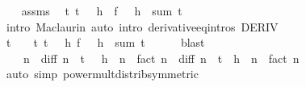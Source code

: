 \begin{isabellebody}
\ \ \isamarkupfalse%
\ assms\ \isamarkupfalse%
\ {\isachardoublequoteopen}{\isasymexists}t{\isachargreater}{\kern0pt}{}{\isachardot}{\kern0pt}\ t\ {\isacharless}{\kern0pt}\ {\isacharminus}{\kern0pt}\ h\ {\isasymand}\ f\ {\isacharparenleft}{\kern0pt}{\isacharminus}{\kern0pt}\ {\isacharparenleft}{\kern0pt}{\isacharminus}{\kern0pt}\ h{\isacharparenright}{\kern0pt}{\isacharparenright}{\kern0pt}\ {\isacharequal}{\kern0pt}\ {\isacharquery}{\kern0pt}sum\ t{\isachardoublequoteclose}\isanewline
\ \ \ \ \isamarkupfalse%
\ {\isacharparenleft}{\kern0pt}intro\ Maclaurin{\isacharparenright}{\kern0pt}\ {\isacharparenleft}{\kern0pt}auto\ intro{\isacharbang}{\kern0pt}{\isacharcolon}{\kern0pt}\ derivative{\isacharunderscore}{\kern0pt}eq{\isacharunderscore}{\kern0pt}intros\ DERIV{\isacharprime}{\kern0pt}{\isacharparenright}{\kern0pt}\isanewline
\ \ \isamarkupfalse%
\ \isamarkupfalse%
\ t\ \ {\isachardoublequoteopen}{}\ {\isacharless}{\kern0pt}\ t{\isachardoublequoteclose}\ {\isachardoublequoteopen}t\ {\isacharless}{\kern0pt}\ {\isacharminus}{\kern0pt}\ h{\isachardoublequoteclose}\ {\isachardoublequoteopen}f\ {\isacharparenleft}{\kern0pt}{\isacharminus}{\kern0pt}\ {\isacharparenleft}{\kern0pt}{\isacharminus}{\kern0pt}\ h{\isacharparenright}{\kern0pt}{\isacharparenright}{\kern0pt}\ {\isacharequal}{\kern0pt}\ {\isacharquery}{\kern0pt}sum\ t{\isachardoublequoteclose}\isanewline
\ \ \ \ \isamarkupfalse%
\ blast\isanewline
\ \ \isamarkupfalse%
\ \isamarkupfalse%
\ {\isachardoublequoteopen}{\isacharparenleft}{\kern0pt}{\isacharminus}{\kern0pt}\ {}{\isacharparenright}{\kern0pt}\ {\isacharcircum}{\kern0pt}\ n\ {\isacharasterisk}{\kern0pt}\ diff\ n\ {\isacharparenleft}{\kern0pt}{\isacharminus}{\kern0pt}\ t{\isacharparenright}{\kern0pt}\ {\isacharasterisk}{\kern0pt}\ {\isacharparenleft}{\kern0pt}{\isacharminus}{\kern0pt}\ h{\isacharparenright}{\kern0pt}\ {\isacharcircum}{\kern0pt}\ n\ {\isacharslash}{\kern0pt}\ fact\ n\ {\isacharequal}{\kern0pt}\ diff\ n\ {\isacharparenleft}{\kern0pt}{\isacharminus}{\kern0pt}\ t{\isacharparenright}{\kern0pt}\ {\isacharasterisk}{\kern0pt}\ h\ {\isacharcircum}{\kern0pt}\ n\ {\isacharslash}{\kern0pt}\ fact\ n{\isachardoublequoteclose}\isanewline
\ \ \ \ \isamarkupfalse%
\ {\isacharparenleft}{\kern0pt}auto\ simp{\isacharcolon}{\kern0pt}\ power{\isacharunderscore}{\kern0pt}mult{\isacharunderscore}{\kern0pt}distrib{\isacharbrackleft}{\kern0pt}symmetric{\isacharbrackright}{\kern0pt}{\isacharparenright}{\kern0pt}\isanewline

\end{isabellebody}
